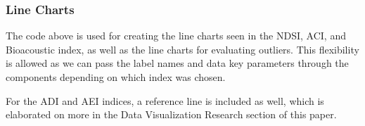 \subsubsection{Line Charts}


The code above is used for creating the line charts seen in the NDSI, ACI, and Bioacoustic index, as well as the line charts for evaluating outliers. This flexibility is allowed as we can pass the label names and data key parameters through the components depending on which index was chosen.\par


For the ADI and AEI indices, a reference line is included as well, which is elaborated on more in the Data Visualization Research section of this paper.
